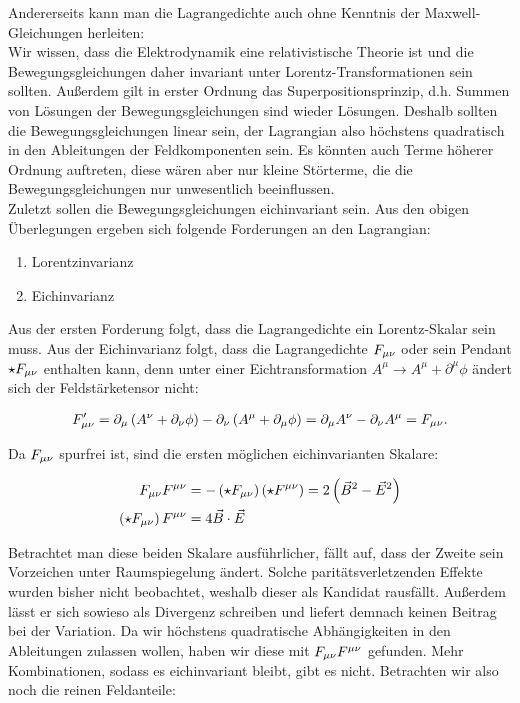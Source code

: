 Andererseits kann man die Lagrangedichte auch ohne Kenntnis der Maxwell-Gleichungen herleiten: \\
Wir wissen, dass die Elektrodynamik eine relativistische Theorie ist und die Bewegungsgleichungen daher invariant unter Lorentz-Transformationen sein sollten. Außerdem gilt in erster Ordnung das Superpositionsprinzip, d.h. Summen von Lösungen der Bewegungsgleichungen sind wieder Lösungen. Deshalb sollten die Bewegungsgleichungen linear sein, der Lagrangian also höchstens quadratisch in den Ableitungen der Feldkomponenten sein. Es könnten auch Terme höherer Ordnung auftreten, diese wären aber nur kleine Störterme, die die Bewegungsgleichungen nur unwesentlich beeinflussen. \\ 
Zuletzt sollen die Bewegungsgleichungen eichinvariant sein.
Aus den obigen Überlegungen ergeben sich folgende Forderungen an den Lagrangian: \\
\begin{enumerate}
	\item Lorentzinvarianz
	\item Eichinvarianz 
\end{enumerate}

Aus der ersten Forderung folgt, dass die Lagrangedichte ein Lorentz-Skalar sein muss. Aus der Eichinvarianz folgt, dass die Lagrangedichte $F_{\mu \nu}$ oder sein Pendant $\star F_{\mu \nu}$ enthalten kann, denn unter einer Eichtransformation $A^{\mu} \rightarrow A^{\mu} + \partial^{\mu} \phi$ ändert sich der Feldstärketensor nicht:

\begin{align}
F_{\mu \nu} ' = \partial_{\mu} \left( A^{\nu} + \partial_{\nu} \phi \right) - \partial_{\nu} \left( A^{\mu} + \partial_{\mu} \phi \right) = \partial_{\mu}  A^{\nu} - \partial_{\nu} A^{\mu} = F_{\mu \nu}.
\end{align}

Da $F_{\mu \nu}$ spurfrei ist, sind die ersten möglichen eichinvarianten Skalare:

\begin{align}
F_{\mu \nu} F^{\mu \nu} &= - \left( \star F_{\mu \nu} \right) \left( \star F^{\mu \nu} \right) = 2 \left( \vec{B}^2 - \vec{E}^2 \right) \\
\left( \star F_{\mu \nu} \right) F^{\mu \nu} &= 4 \vec{B} \cdot \vec{E}
\end{align}

Betrachtet man diese beiden Skalare ausführlicher, fällt auf, dass der Zweite sein Vorzeichen unter Raumspiegelung ändert. Solche paritätsverletzenden Effekte wurden bisher nicht beobachtet, weshalb dieser als Kandidat rausfällt. Außerdem lässt er sich sowieso als Divergenz schreiben und liefert demnach keinen Beitrag bei der Variation. Da wir höchstens quadratische Abhängigkeiten in den Ableitungen zulassen wollen, haben wir diese mit $F_{\mu \nu} F^{\mu \nu}$ gefunden. Mehr Kombinationen, sodass es eichinvariant bleibt, gibt es nicht. Betrachten wir also noch die reinen Feldanteile: \\

